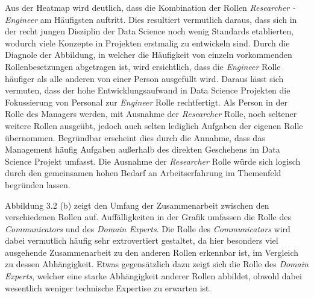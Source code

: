 Aus der Heatmap wird deutlich, dass die Kombination der Rollen \textit{Researcher - Engineer} am Häufigsten auftritt.
Dies resultiert vermutlich daraus, dass sich in der recht jungen Disziplin der Data Science noch wenig Standards etablierten, wodurch viele Konzepte in Projekten erstmalig zu entwickeln sind.
Durch die Diagnole der Abbildung, in welcher die Häufigkeit von einzeln vorkommenden Rollenbesetzungen abgetragen ist, wird ersichtlich, dass die \textit{Engineer} Rolle häufiger als alle anderen von einer Person ausgefüllt wird.
Daraus lässt sich vermuten, dass der hohe Entwicklungsaufwand in Data Science Projekten die Fokussierung von Personal zur \textit{Engineer} Rolle rechtfertigt.
Als Person in der Rolle des Managers werden, mit Ausnahme der \textit{Researcher} Rolle, noch seltener weitere Rollen ausgeübt, jedoch auch selten lediglich Aufgaben der eigenen Rolle übernommen.
Begründbar erscheint dies durch die Annahme, dass das Management häufig Aufgaben außerhalb des direkten Geschehens im Data Science Projekt umfasst.
Die Ausnahme der \textit{Researcher} Rolle würde sich logisch durch den gemeinsamen hohen Bedarf an Arbeitserfahrung im Themenfeld begründen lassen.

Abbildung 3.2 (b) zeigt den Umfang der Zusammenarbeit zwischen den verschiedenen Rollen auf.
Auffälligkeiten in der Grafik umfassen die Rolle des \textit{Communicators} und des \textit{Domain Experts}.
Die Rolle des \textit{Communicators} wird dabei vermutlich häufig sehr extrovertiert gestaltet, da hier besonders viel ausgehende Zusammenarbeit zu den anderen Rollen erkennbar ist, im Vergleich zu dessen Abhängigkeit.
Etwas gegensätzlich dazu zeigt sich die Rolle des \textit{Domain Experts}, welcher eine starke Abhängigkeit anderer Rollen abbildet, obwohl dabei wesentlich weniger technische Expertise zu erwarten ist.

